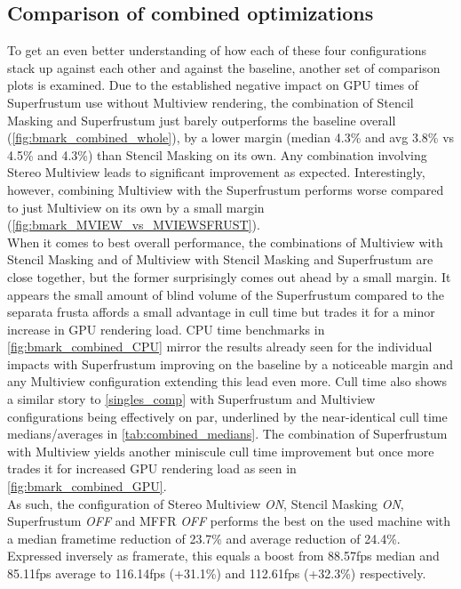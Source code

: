 \subsection{Comparison of combined optimizations}
To get an even better understanding of how each of these four configurations stack up against each other and against the baseline, another set of comparison plots is examined. 
Due to the established negative impact on GPU times of Superfrustum use without Multiview rendering, the combination of Stencil Masking and Superfrustum just barely outperforms the baseline overall (\autoref{fig:bmark_combined_whole}), by a lower margin (median 4.3\% and avg 3.8\% vs 4.5\% and 4.3\%) than Stencil Masking on its own. Any combination involving Stereo Multiview leads to significant improvement as expected. Interestingly, however, combining Multiview with the Superfrustum performs worse compared to just Multiview on its own by a small margin (\autoref{fig:bmark_MVIEW_vs_MVIEWSFRUST}). \\
When it comes to best overall performance, the combinations of Multiview with Stencil Masking and of Multiview with Stencil Masking and Superfrustum are close together, but the former surprisingly comes out ahead by a small margin. It appears the small amount of blind volume of the Superfrustum compared to the separata frusta affords a small advantage in cull time but trades it for a minor increase in GPU rendering load. 
CPU time benchmarks in \autoref{fig:bmark_combined_CPU} mirror the results already seen for the individual impacts with Superfrustum improving on the baseline by a noticeable margin and any Multiview configuration extending this lead even more. Cull time also shows a similar story to \autoref{singles_comp} with Superfrustum and Multiview configurations being effectively on par, underlined by the near-identical cull time medians/averages in \autoref{tab:combined_medians}. The combination of Superfrustum with Multiview yields another miniscule cull time improvement but once more trades it for increased GPU rendering load as seen in \autoref{fig:bmark_combined_GPU}. \\
As such, the configuration of Stereo Multiview \textit{ON}, Stencil Masking \textit{ON}, Superfrustum \textit{OFF} and \gls{MFFR} \textit{OFF} performs the best on the used machine with a median frametime reduction of 23.7\% and average reduction of 24.4\%. Expressed inversely as framerate, this equals a boost from 88.57fps median and 85.11fps average to 116.14fps (+31.1\%) and 112.61fps (+32.3\%) respectively. \\

